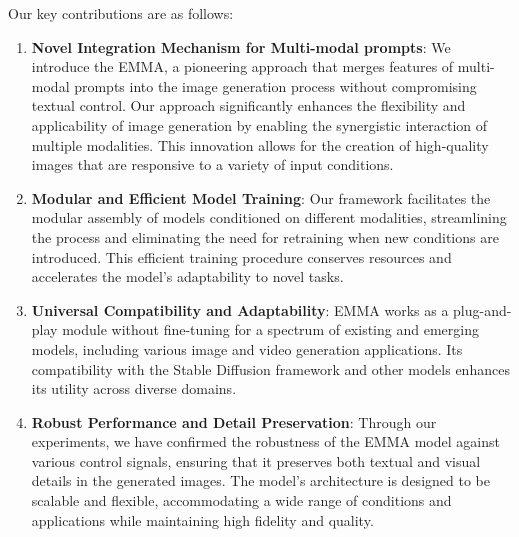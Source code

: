 Our key contributions are as follows:
\begin{enumerate}
    \item \textbf{Novel Integration Mechanism for Multi-modal prompts}: We introduce the EMMA, a pioneering approach that merges features of multi-modal prompts into the image generation process without compromising textual control. Our approach significantly enhances the flexibility and applicability of image generation by enabling the synergistic interaction of multiple modalities. This innovation allows for the creation of high-quality images that are responsive to a variety of input conditions.
    \item \textbf{Modular and Efficient Model Training}: Our framework facilitates the modular assembly of models conditioned on different modalities, streamlining the process and eliminating the need for retraining when new conditions are introduced. This efficient training procedure conserves resources and accelerates the model's adaptability to novel tasks.
    \item \textbf{Universal Compatibility and Adaptability}: EMMA works as a plug-and-play module without fine-tuning for a spectrum of existing and emerging models, including various image and video generation applications. Its compatibility with the Stable Diffusion framework and other models enhances its utility across diverse domains.
    \item \textbf{Robust Performance and Detail Preservation}: Through our experiments, we have confirmed the robustness of the EMMA model against various control signals, ensuring that it preserves both textual and visual details in the generated images. The model's architecture is designed to be scalable and flexible, accommodating a wide range of conditions and applications while maintaining high fidelity and quality.
\end{enumerate}